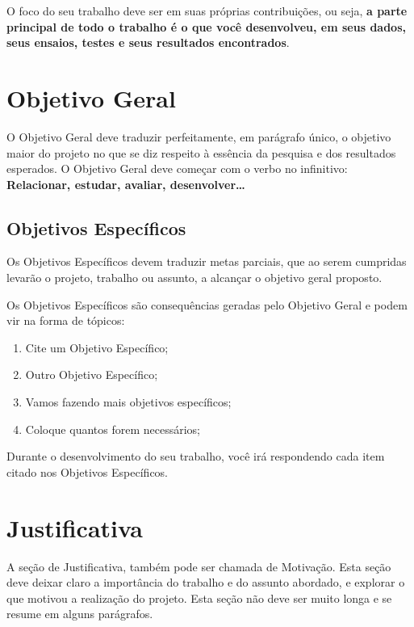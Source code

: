O foco do seu trabalho deve ser em suas próprias contribuições, ou seja, {\bf a parte principal de todo o trabalho é o que você desenvolveu, em seus dados, seus ensaios, testes e seus resultados encontrados}.


\section{Objetivo Geral}

O Objetivo Geral deve traduzir perfeitamente, em parágrafo único, o objetivo maior do projeto no que se diz respeito à essência da pesquisa e dos resultados esperados. O Objetivo Geral deve começar com o verbo no infinitivo: {\bf Relacionar, estudar, avaliar, desenvolver\ldots}
    

\subsection{Objetivos Específicos}

Os Objetivos Específicos devem traduzir metas parciais, que ao serem cumpridas levarão o projeto, trabalho ou assunto, a alcançar o objetivo geral proposto. 
     
Os Objetivos Específicos são consequências geradas pelo Objetivo Geral e podem vir na forma de tópicos:

\begin{enumerate}
    \item Cite um Objetivo Específico;
    \item Outro Objetivo Específico;
    \item Vamos fazendo mais objetivos específicos;
    \item Coloque quantos forem necessários;
\end{enumerate}

Durante o desenvolvimento do seu trabalho, você irá respondendo cada item citado nos Objetivos Específicos.


\section{Justificativa}

A seção de Justificativa, também pode ser chamada de Motivação. Esta seção deve deixar claro a importância do trabalho e do assunto abordado, e explorar o que motivou a realização do projeto. Esta seção não deve ser muito longa e se resume em alguns parágrafos.

    
